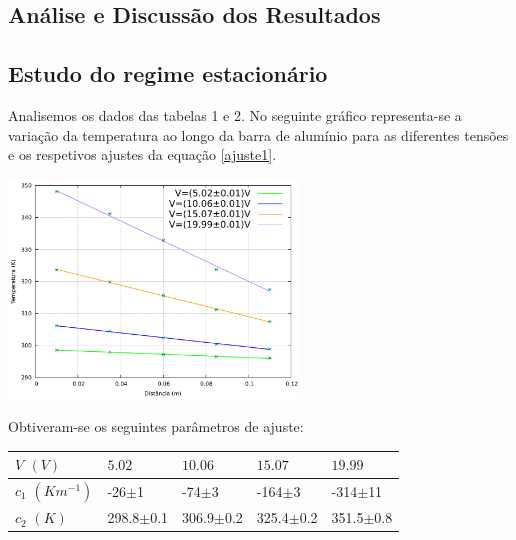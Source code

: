 \documentclass[8pt]{extarticle}
\begin{document}
\begin{multicols}{2}
\section{Análise e Discussão dos Resultados}

\subsection*{Estudo do regime estacionário}

\par Analisemos os dados das tabelas 1 e 2. No seguinte gráfico representa-se a variação da temperatura ao longo da barra de alumínio para as diferentes tensões e os respetivos ajustes da equação \eqref{ajuste1}.

\begin{center}
\includegraphics[width=220pt]{estacionario.pdf}
\par{}
\end{center}

\par Obtiveram-se os seguintes parâmetros de ajuste:

{\small
\begin{center}
\begin{tabular}{ x{1.5cm} x{1.3cm} x{1.3cm} x{1.3cm} x{1.3cm} } 
$V$ $(V)$ & $5.02$ & $10.06$ & $15.07$ & $19.99$ \tabularnewline
\hline \hline
$c_1$ $(Km^{-1})$ & -26$\pm$1     & -74$\pm$3     &  -164$\pm$3    & -314$\pm$11   \tabularnewline
$c_2$ $(K)$       & 298.8$\pm$0.1 & 306.9$\pm$0.2 & 325.4$\pm$0.2 & 351.5$\pm$0.8 \tabularnewline
\end{tabular}
\par{}
\end{center}
}


\end{multicols}
\end{document}
